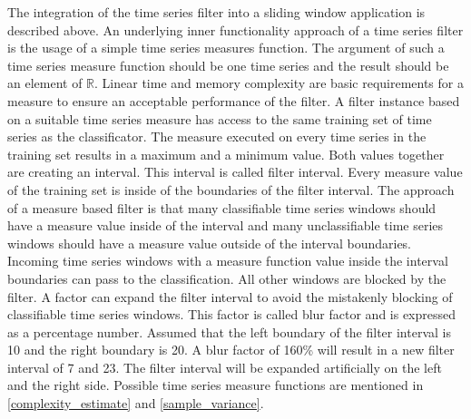 The integration of the time series filter into a sliding window application is described above. An underlying inner
functionality approach of a time series filter is the usage of a simple time series measures function. The argument of
such a time series measure function should be one time series and the result should be an element of $\mathbb{R}$.
Linear time and memory complexity are basic requirements for a measure to ensure an acceptable performance of the
filter. A filter instance based on a suitable time series measure has access to the same training set of time series as
the classificator. The measure executed on every time series in the training set results in a maximum and a minimum
value. Both values together are creating an interval. This interval is called filter interval. Every measure value of the
training set is inside of the boundaries of the filter interval. The approach of a measure based filter is that many
classifiable time series windows should have a measure value inside of the interval and many unclassifiable time series
windows should have a measure value outside of the interval boundaries. Incoming time series windows with a measure
function value inside the interval boundaries can pass to the classification. All other windows are blocked by the
filter. A factor can expand the filter interval to avoid the mistakenly blocking of classifiable time series windows.
This factor is called blur factor and is expressed as a percentage number. Assumed that the left boundary of the filter
interval is 10 and the right boundary is 20. A blur factor of 160\% will result in a new filter interval of 7 and 23.
The filter interval will be expanded artificially on the left and the right side. Possible time series measure functions
are mentioned in \ref{complexity_estimate} and \ref{sample_variance}.
